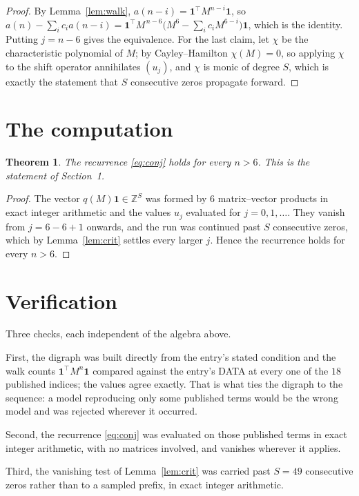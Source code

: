 \documentclass[11pt,a4paper]{article}
\theoremstyle{plain}
\newtheorem{theorem}{Theorem}
\theoremstyle{definition}
\begin{document}
\begin{proof}
By Lemma~\ref{lem:walk}, $a(n-i)=\mathbf{1}^{\!\top}M^{n-i}\mathbf{1}$, so
$a(n)-\sum_i c_i a(n-i)
=\mathbf{1}^{\!\top}M^{\,n-6}\bigl(M^{6}-\sum_i c_i M^{6-i}\bigr)
\mathbf{1}$, which is the identity. Putting $j=n-6$ gives the equivalence. For the
last claim, let $\chi$ be the characteristic polynomial of $M$; by Cayley--Hamilton
$\chi(M)=0$, so applying $\chi$ to the shift operator annihilates $(u_j)$, and $\chi$ is
monic of degree $S$, which is exactly the statement that $S$ consecutive zeros propagate
forward.
\end{proof}

\section{The computation}

\begin{theorem}
The recurrence \eqref{eq:conj} holds for every $n>6$. This is the statement of
Section~1.
\end{theorem}

\begin{proof}
The vector $q(M)\mathbf{1}\in\mathbb{Z}^{S}$ was formed by $6$ matrix--vector
products in exact integer arithmetic and the values $u_j$ evaluated for
$j=0,1,\dots$. They vanish from $j=6-6+1$ onwards, and the run was continued past
$S$ consecutive zeros, which by Lemma~\ref{lem:crit} settles every larger $j$. Hence the
recurrence holds for every $n>6$.
\end{proof}

\section{Verification}

Three checks, each independent of the algebra above.

First, the digraph was built directly from the entry's stated condition and the walk counts
$\mathbf{1}^{\!\top}M^{n}\mathbf{1}$ compared against the entry's DATA at every one of
the $18$ published indices; the values agree exactly. That is what ties the digraph to
the sequence: a model reproducing only some published terms would be the wrong model and
was rejected wherever it occurred.

Second, the recurrence \eqref{eq:conj} was evaluated on those published terms in exact
integer arithmetic, with no matrices involved, and vanishes wherever it applies.

Third, the vanishing test of Lemma~\ref{lem:crit} was carried past $S=49$ consecutive
zeros rather than to a sampled prefix, in exact integer arithmetic.
\end{document}
